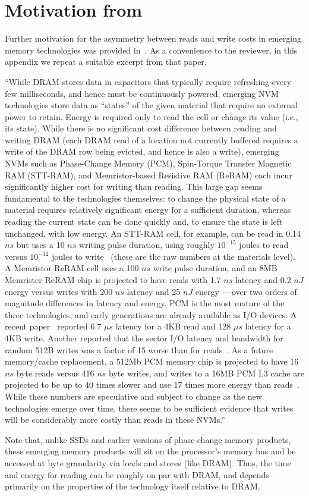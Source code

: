 \section{Motivation from~\cite{BFGGS15}}\label{sec:hardware}

Further motivation for the asymmetry between reads and write costs in
emerging memory technologies was provided in~\cite{BFGGS15}.  As a
convenience to the reviewer, in this appendix we repeat a suitable
excerpt from that paper.

``While DRAM stores data in capacitors that
typically require refreshing every few milliseconds,
and hence must be continuously powered, emerging NVM
technologies store data as ``states'' of the given material that
require no external power to retain.  Energy is required only to read
the cell or change its value (i.e., its state).  While there is no
significant cost difference between reading and writing DRAM (each
DRAM read of a location not currently buffered requires a write of
the DRAM row being evicted, and hence is also a write),
emerging NVMs such as Phase-Change Memory (PCM), Spin-Torque
Transfer Magnetic RAM (STT-RAM), and Memristor-based Resistive RAM
(ReRAM) each incur significantly higher cost for writing than reading.
This large gap seems fundamental to the technologies themselves: to
change the physical state of a material requires relatively
significant energy for a sufficient duration, whereas reading the
current state can be done quickly and, to ensure the state is left
unchanged, with low energy.  An STT-RAM cell, for example, can be read
in 0.14 $ns$ but uses a 10 $ns$ writing pulse duration, using roughly
$10^{-15}$ joules to read versus $10^{-12}$ joules to
write~\cite{Dong08} (these are the raw numbers at the materials
level).  A Memristor ReRAM cell uses a 100 $ns$ write pulse duration, and
an 8MB Memrister ReRAM chip is projected to have reads with 1.7 $ns$
latency and 0.2 $nJ$ energy versus writes with 200 $ns$ latency and 25 $nJ$
energy~\cite{Xu11}---over two orders of magnitude differences in latency
and energy.  PCM is the most mature of the three technologies, and
early generations are already available as I/O devices.  A recent
paper~\cite{Kim14} reported 6.7 $\mu s$ latency for a 4KB read and
128 $\mu s$ latency for a 4KB write.  Another reported that the
sector I/O latency and bandwidth for random 512B writes was a factor
of 15 worse than for reads~\cite{ibm-pcm14b}.  As a future memory/cache
replacement, a 512Mb PCM memory chip is projected to have 16 $ns$ byte
reads versus 416 $ns$ byte writes, and writes to a 16MB PCM L3 cache
are projected to be up to 40 times slower and use 17 times more energy
than reads~\cite{Dong09}.  While these numbers are speculative and subject
to change as the new technologies emerge over time, there seems to be
sufficient evidence that writes will be considerably more costly than
reads in these NVMs.''

Note that, unlike SSDs and earlier versions of phase-change memory products,
these emerging memory products will sit on the processor's memory bus and be
accessed at byte granularity via loads and stores (like DRAM).  Thus, the
time and energy for reading can be roughly on par with DRAM, and depends
primarily on the properties of the technology itself relative to DRAM.
